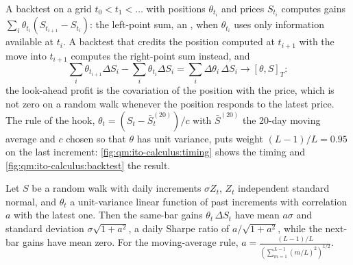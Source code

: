 A backtest on a grid $t_0 < t_1 < \dots$ with positions $\theta_{t_i}$ and prices $S_{t_i}$ computes
gains $\sum_i\theta_{t_i}(S_{t_{i+1}} - S_{t_i})$: the left-point sum, an , when
$\theta_{t_i}$ uses only information available at $t_i$. A backtest that credits the position
computed at $t_{i+1}$ with the move into $t_{i+1}$ computes the right-point sum instead, and
\[
\sum_i\theta_{t_{i+1}}\Delta S_i - \sum_i\theta_{t_i}\Delta S_i = \sum_i\Delta\theta_i\,\Delta S_i
\longrightarrow [\theta, S]_T:
\]
the look-ahead profit is the covariation of the position with the price, which is not zero
on a random walk whenever the position responds to the latest price. The rule of the hook,
$\theta_t = (S_t - \bar S^{(20)}_t)/c$ with $\bar S^{(20)}$ the 20-day moving average and $c$ chosen
so that $\theta$ has unit variance, puts weight $(L - 1)/L = 0.95$ on the last increment:
\cref{fig:qm:ito-calculus:timing} shows the timing and \cref{fig:qm:ito-calculus:backtest} the
result.

\begin{omfigure}

\label{fig:qm:ito-calculus:timing}
\end{omfigure}

\begin{proposition}\label{prop:qm:ito-calculus:lookahead}
Let $S$ be a random walk with daily increments $\sigma Z_t$, $Z_t$ independent standard normal,
and $\theta_t$ a unit-variance linear function of past increments with correlation $a$ with the
latest one. Then the same-bar gains $\theta_t\,\Delta S_t$ have mean $a\sigma$ and standard
deviation $\sigma\sqrt{1 + a^2}$, a daily Sharpe ratio of $a/\sqrt{1 + a^2}$, while the next-bar
gains have mean zero. For the moving-average rule, $a = \frac{(L-1)/L}{(\sum_{m=1}^{L-1}(m/L)^2)^{1/2}}$.
\end{proposition}

